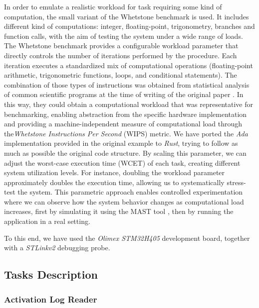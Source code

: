 In order to emulate a realistic workload for task requiring some kind of
computation, the small variant of the Whetstone benchmark
\cite{curnowSyntheticBenchmark1976} is used. It includes different kind of
computations: integer, floating-point, trigonometry, branches and function
calls, with the aim of testing the system under a wide range of loads. \\
\label{lab:whetstone-explanation}
The Whetstone benchmark provides a configurable workload parameter that directly 
controls the number of iterations performed by the procedure. Each iteration 
executes a standardized mix of computational operations (floating-point arithmetic, 
trigonometric functions, loops, and conditional statements).
The combination of those types of instructions was obtained from statistical
analysis of common scientific programs at the time of writing of the original
paper \cite{curnowSyntheticBenchmark1976}. In this way, they could obtain a
computational workload that was representative for benchmarking, enabling
abstraction from the specific hardware implementation and providing a
machine-independent measure of computational load through the\textit{Whetstone
Instructions Per Second} (WIPS) metric.
We have ported the \textit{Ada} implementation provided in the original example
\cite{huJiayihuSRT2024} to \textit{Rust}, trying to follow as much as possible 
the original code structure.
By scaling this parameter, we can adjust the worst-case execution time (WCET) of
each task, creating different system utilization levels. 
For instance, doubling the workload parameter approximately doubles the  
execution time, allowing us to systematically stress-test the system. This parametric 
approach enables controlled experimentation where we can observe how the system 
behavior changes as computational load increases, first by simulating it using 
the MAST tool \cite{MASTComprehensiveTool}, then by running the application in 
a real setting.

To this end, we have used the \textit{Olimex STM32\-H405} \cite{olimexSTM32H405}
development board, together with a \textit{STLink\-v2} \cite{STLINKV2Tool}
debugging probe. 

\subsection{Tasks Description}

\subsubsection{Activation Log Reader}

